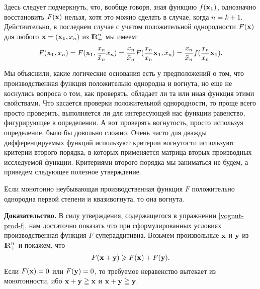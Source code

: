     Здесь следует подчеркнуть, что, вообще говоря,
    зная функцию  $f(\mathbf{x_{1}})$, однозначно восстановить
    $F(\mathbf{x})$ нельзя, хотя это можно сделать в случае, когда
    $n=k+1$. Действительно, в последнем случае с учетом
    положительной однородности $F(\mathbf{x})$ для любого
    $\mathbf{x}=(\mathbf{x_{1}},x_{n})$ из ${\rm I\!R}^{n}_{+}$ мы имеем:
\[
    F(\mathbf{x_{1}},x_{n})=F(\mathbf{x_{1}},\frac{x_{n}}{\bar{x}_{n}}\bar{x}_{n})
    =\frac{x_{n}}{\bar{x}_{n}}F(\frac{\bar{x}_{n}}{x_{n}}\mathbf{x_{1}},\bar{x}_{n})
    =\frac{x_{n}}{\bar{x}_{n}}f(\frac{\bar{x}_{n}}{x_{n}}\mathbf{x_{1}}).
\]


    Мы объяснили, какие  логические основания есть у предположений о
    том, что производственная функция положительно однородна и
    вогнута, но еще не коснулись вопроса о том, как проверять,
    обладает ли та или иная функция этими свойствами. Что касается
    проверки положительной однородности, то проще всего просто проверить, выполняется
    ли для интересующей нас функции равенство, фигурирующее в
    определении. А вот проверять вогнутость, просто используя
    определение, было бы довольно сложно. Очень часто для дважды
    дифференцируемых функций используют критерии вогнутости
    используют критерии второго порядка, в которых применяется
    матрица вторых производных исследуемой функции. Критериями
    второго порядка мы заниматься не будем, а приведем следующее
    полезное утверждение.



\begin{prop}
\label{vognut-prod-f}
    Если монотонно неубывающая производственная функция $F$ положительно
    однородна первой степени и квазивогнута, то она вогнута.
\end{prop}

    \textbf{Доказательство.} В силу утверждения, содержащегося в упражнении
    \ref{vognut-prod-f}, нам достаточно показать что при сформулированных
    условиях производственная функция $F$ супераддитивна.
    Возьмем произвольные $\mathbf{x}$ и $\mathbf{y}$ из ${\rm I\!R}_{+}^{n}$  и покажем, что
    \[F(\mathbf{x}+\mathbf{y})\geqslant F(\mathbf{x})+F(\mathbf{y}). \]
    Если $F(\mathbf{x})=0$ или $F(\mathbf{y})=0$, то требуемое неравенство вытекает из
    монотонности, ибо $\mathbf{x}+\mathbf{y}\geqq\mathbf{x}$ и $\mathbf{x}+\mathbf{y}\geqq\mathbf{y}$.

